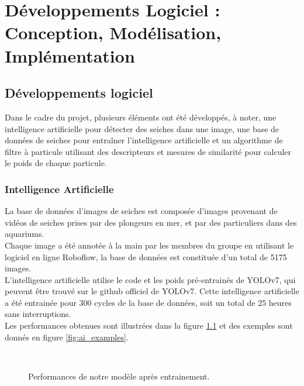 \pagestyle{plain}
\chapter{Développements Logiciel : Conception, Modélisation, Implémentation} 

\section{Développements logiciel}
Dans le cadre du projet, plusieurs éléments ont été développés, à noter, une intelligence artificielle pour détecter des seiches dans une image, une base de données de seiches pour entraîner l'intelligence artificielle et un algorithme de filtre à particule utilisant des descripteurs et mesures de similarité pour calculer le poids de chaque particule.\\

\subsection{Intelligence Artificielle}
La base de données d'images de seiches est composée d'images provenant de vidéos de seiches prises par des plongeurs en mer, et par des particuliers dans des aquariums.\\
Chaque image a été annotée à la main par les membres du groupe en utilisant le logiciel en ligne Roboflow, la base de données est constituée d'un total de 5175 images.\\
L'intelligence artificielle utilise le code et les poids pré-entrainés de YOLOv7\cite{wang_yolov7_nodate}, qui peuvent être trouvé sur le github officiel de YOLOv7\cite{yolov7_github}.
Cette intelligence artificielle a été entrainée pour 300 cycles de la base de données, soit un total de 25 heures sans interruptions.\\
Les performances obtenues sont illustrées dans la figure \ref{fig:ai_results} et des exemples sont donnés en figure \ref{fig:ai_examples}.\\

\begin{figure}[!htbp]
\center
	\\
\caption{Performances de notre modèle après entrainement.}
\label{fig:ai_results}
\end{figure}
\FloatBarrier

